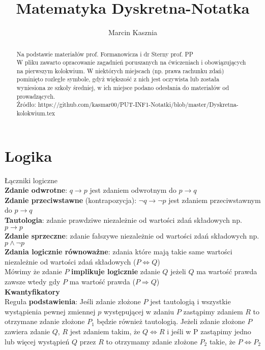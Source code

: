 \documentclass[a4paper,12pt]{article}
\title{Matematyka Dyskretna-Notatka}
\author{Marcin Kasznia}
\begin{document}
\maketitle
\begin{abstract}
Na podstawie materiałów prof. Formanowicza i dr Sterny prof. PP\\
W pliku zawarto opracowanie zagadnień poruszanych na ćwiczeniach i obowiązujących na pierwszym kolokwium. W niektórych miejscach (np. prawa rachunku zdań) pominięto rozległe symbole, gdyż większość z nich jest oczywista lub została wyniesiona ze szkoły średniej, w ich miejsce podano odesłania do materiałów od prowadzących.\\
Źródło: https://github.com/kasmar00/PUT-INF1-Notatki/blob/master/Dyskretna-kolokwium.tex \\
\end{abstract}

\section{Logika}
Łączniki logiczne \\
\textbf{Zdanie odwrotne}: $q \to p$ jest zdaniem odwrotnym do $p \to q$ \\
\textbf{Zdanie przeciwstawne} (kontrapozycja): $\neg q \to \neg p$ jest zdaniem przeciwstawnym do $p \to q$ \\
\textbf{Tautologia}: zdanie prawdziwe niezależnie od wartości zdań składowych np. $p\to p$ \\
\textbf{Zdanie sprzeczne}: zdanie fałszywe niezależnie od wartości zdań składowych np. $p \land \neg p $ \\
\textbf{Zdania logicznie równoważne}: zdania które mają takie same wartości niezależnie od wartości zdań składowych ($P \Leftrightarrow Q $) \\
Mówimy że zdanie $P$ \textbf{implikuje logicznie} zdanie $Q$ jeżeli $Q$ ma wartość prawda zawsze wtedy gdy $P$ ma wartość prawda ($P \Rightarrow Q$)\\
\textbf{Kwantyfikatory}\\
Reguła \textbf{podstawienia}: Jeśli zdanie złożone $P$ jest tautologią i wszystkie wystąpienia pewnej zmiennej $p$ występującej w zdaniu $P$ zastąpimy zdaniem $R$ to otrzymane zdanie złożone $P_1$ będzie również tautologią. Jeżeli zdanie złożone $P$ zawiera zdanie $Q$, $R$ jest zdaniem takim, że $Q\Leftrightarrow R$ i jeśli w P zastąpimy jedno lub więcej wystąpień $Q$ przez $R$ to otrzymamy zdanie złożone $P_2$ takie, że $P \Leftrightarrow P_2$
\end{document}

